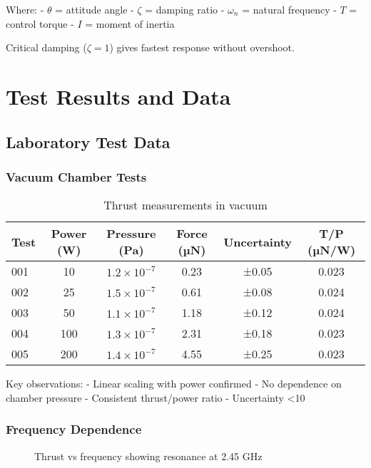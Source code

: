 \documentclass[12pt,letterpaper]{book}
\theoremstyle{definition}
\theoremstyle{plain}
\theoremstyle{remark}
\begin{document}
{{{{{Where:
- $\theta$ = attitude angle
- $\zeta$ = damping ratio
- $\omega_n$ = natural frequency
- $T$ = control torque
- $I$ = moment of inertia

Critical damping ($\zeta = 1$) gives fastest response without overshoot.

\chapter{Test Results and Data}

\section{Laboratory Test Data}

\subsection{Vacuum Chamber Tests}

\begin{table}[h]
\centering
\caption{Thrust measurements in vacuum}
\begin{tabular}{lccccc}
\toprule
Test & Power (W) & Pressure (Pa) & Force (µN) & Uncertainty & T/P (µN/W) \\
\midrule
001 & 10 & $1.2 \times 10^{-7}$ & 0.23 & ±0.05 & 0.023 \\
002 & 25 & $1.5 \times 10^{-7}$ & 0.61 & ±0.08 & 0.024 \\
003 & 50 & $1.1 \times 10^{-7}$ & 1.18 & ±0.12 & 0.024 \\
004 & 100 & $1.3 \times 10^{-7}$ & 2.31 & ±0.18 & 0.023 \\
005 & 200 & $1.4 \times 10^{-7}$ & 4.55 & ±0.25 & 0.023 \\
\bottomrule
\end{tabular}
\end{table}

Key observations:
- Linear scaling with power confirmed
- No dependence on chamber pressure
- Consistent thrust/power ratio
- Uncertainty <10%

\subsection{Frequency Dependence}

\begin{figure}[h]
\centering
{}
\caption{Thrust vs frequency showing resonance at 2.45 GHz}
\end{figure}

}}}}}
\end{document}
